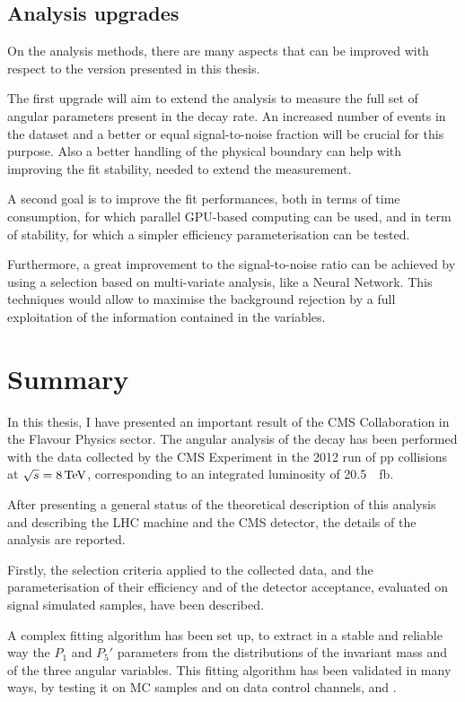 \subsection{Analysis upgrades}
\label{sec:AnalUpg}

On the analysis methods, there are many aspects that can be improved with respect to the version presented in this thesis.

The first upgrade will aim to extend the analysis to measure the full set of angular parameters present in the decay rate.
An increased number of events in the dataset and a better or equal signal-to-noise fraction will be crucial for this purpose.
Also a better handling of the physical boundary can help with improving the fit stability, needed to extend the measurement.

A second goal is to improve the fit performances, both in terms of time consumption, for which parallel GPU-based computing can be used, and in term of stability, for which a simpler efficiency parameterisation can be tested.

Furthermore, a great improvement to the signal-to-noise ratio can be achieved by using a selection based on multi-variate analysis, like a Neural Network. This techniques would allow to maximise the background rejection by a full exploitation of the information contained in the variables.


\section{Summary}
\label{sec:Summ}

In this thesis, I have presented an important result of the CMS Collaboration in the Flavour Physics sector.
The angular analysis of the \BtoKstmumu decay has been performed with the data collected by the CMS Experiment in the 2012 run of pp collisions at $\sqrt{s}=8\,\textrm{TeV}$, corresponding to an integrated luminosity of \SI{20.5}{\per\femto\barn}.

After presenting a general status of the theoretical description of this analysis and describing the LHC machine and the CMS detector, the details of the analysis are reported.

Firstly, the selection criteria applied to the collected data, and the parameterisation of their efficiency and of the detector acceptance, evaluated on signal simulated samples, have been described.

A complex fitting algorithm has been set up, to extract in a stable and reliable way the $P_1$ and $P_5'$ parameters from the distributions of the \PKp\Pgpm\Pgmp\Pgmm invariant mass and of the three angular variables.
This fitting algorithm has been validated in many ways, by testing it on MC samples and on data control channels, \BtoKstJpsimumu and \BtoKstpsipmumu.

